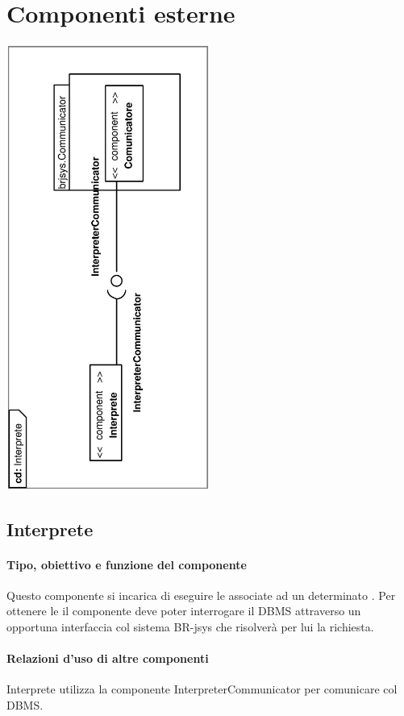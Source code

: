 \documentclass[11pt,titlepage,a4paper]{report}
\begin{document}
\chapter{Componenti esterne}
\begin{center}
 \includegraphics[width=0.5\textwidth, angle=-90]{DiagrammaClassi/Interprete.eps}
\end{center}
\section{Interprete}
\subsubsection{Tipo, obiettivo e funzione del componente}
Questo componente si incarica di eseguire le \brs associate ad un determinato \bo. Per ottenere le \brs il componente deve poter interrogare il DBMS attraverso un opportuna interfaccia col sistema BR-jsys che risolver\`a per lui la richiesta.
\subsubsection{Relazioni d'uso di altre componenti}
Interprete utilizza la componente InterpreterCommunicator per comunicare col DBMS.
\end{document}
